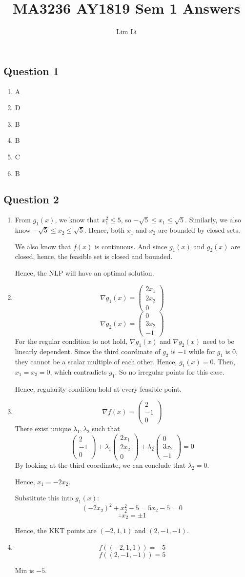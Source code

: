 \documentclass{article}
\newcommand{\vvv}[3]{\begin{pmatrix}#1\\#2\\#3\end{pmatrix}}
\begin{document}
\title{MA3236 AY1819 Sem 1 Answers}
\author{Lim Li}
\maketitle

\subsection*{Question 1}
\begin{enumerate}
\item A
\item D
\item B
\item B
\item C
\item B
\end{enumerate}

\subsection*{Question 2}

\begin{enumerate}[label=(\roman*)]
\item From $g_1(x)$, we know that $x_1^2 \leq 5$, so $-\sqrt{5} \leq x_1 \leq \sqrt{5}$. Similarly, we also know $-\sqrt{5} \leq x_2 \leq \sqrt{5}$. Hence, both $x_1$ and $x_2$ are bounded by closed sets.

We also know that $f(x)$ is continuous. And since $g_1(x)$ and $g_2(x)$ are closed, hence, the feasible set is closed and bounded.

Hence, the NLP will have an optimal solution.

\item
    \[\nabla g_1(x) = \vvv{2x_1}{2x_2}{0}\]
    \[\nabla g_2(x) = \vvv{0}{3x_2}{-1}\]
    For the regular condition to not hold, $\nabla g_1(x)$ and $\nabla g_2(x)$ need to be linearly dependent. Since the third coordinate of $g_2$ is $-1$ while for $g_1$ is 0, they cannot be a scalar multiple of each other. Hence, $g_1(x)=0$.  Then, $x_1=x_2=0$, which contradicts $g_1$. So no irregular points for this case.
    
    Hence, regularity condition hold at every feasible point.

\item
    \[\nabla f(x) = \vvv{2}{-1}{0}\]
    There exist unique $\lambda_1,\lambda_2$ such that
    \[\vvv{2}{-1}{0} + \lambda_1 \vvv{2x_1}{2x_2}{0} + \lambda_2 \vvv{0}{3x_2}{-1} = 0\]
    By looking at the third coordinate, we can conclude that $\lambda_2=0$.
    
    Hence, $x_1=-2x_2$.
    
    Substitute this into $g_1(x)$:
    \[(-2x_2)^2+x_2^2-5=5x_2-5=0\]
    \[\therefore x_2=\pm 1\]
    
    Hence, the KKT points are $(-2,1,1)$ and $(2,-1,-1)$.
\item
    \[f((-2,1,1)) = -5\]
    \[f((2,-1,-1)) = 5\]
    
    Min is $-5$.
\end{enumerate}
\end{document}
